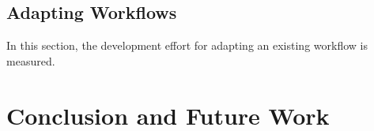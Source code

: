 \documentclass[a4paper,top=25mm,bottom=25mm,12pt,pdftex,halfparskip,twoside,bibtotoc,numbers=noenddot]{scrbook}
\begin{document}
\section{Adapting Workflows}

In this section, the development effort for adapting an existing workflow is measured.




\chapter{Conclusion and Future Work}



\printbibliography
\end{document}
